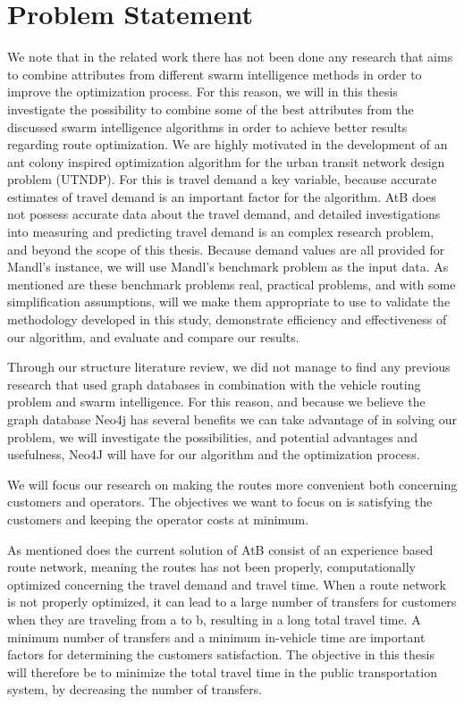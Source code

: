 \section{Problem Statement} 

We note that in the related work there has not been done any research that aims to combine attributes from different swarm intelligence methods in order to improve the optimization process. For this reason, we will in this thesis investigate the possibility to combine some of the best attributes from the discussed swarm intelligence algorithms in order to achieve better results regarding route optimization. We are highly motivated in the development of an ant colony inspired optimization algorithm for the urban transit network design problem (UTNDP). For this is travel demand a key variable, because accurate estimates of travel demand is an important factor for the algorithm. AtB does not possess accurate data about the travel demand, and detailed investigations into measuring and predicting travel demand is an complex research problem, and beyond the scope of this thesis. Because demand values are all provided for Mandl's instance, we will use Mandl's benchmark problem \citep{mandl79} as the input data. As mentioned are these benchmark problems real, practical problems, and with some simplification assumptions, will we make them appropriate to use to validate the methodology developed in this study, demonstrate efficiency and effectiveness of our algorithm, and evaluate and compare our results. 

Through our structure literature review, we did not manage to find any previous research that used graph databases in combination with the vehicle routing problem and swarm intelligence. For this reason, and because we believe the graph database Neo4j \citep{website:neo4j} has several benefits we can take advantage of in solving our problem, we will investigate the possibilities, and potential advantages and usefulness, Neo4J will have for our algorithm and the optimization process.

We will focus our research on making the routes more convenient both concerning customers and operators. The objectives we want to focus on is satisfying the customers and keeping the operator costs at minimum. 

As mentioned does the current solution of AtB \citep{website:atb} consist of an experience based route network, meaning the routes has not been properly, computationally optimized concerning the travel demand and travel time. When a route network is not properly optimized, it can lead to a large number of transfers for customers when they are traveling from a to b, resulting in a long total travel time. A minimum number of transfers and a minimum in-vehicle time are important factors for determining the customers satisfaction. The objective in this thesis will therefore be to minimize the total travel time in the public transportation system, by decreasing the number of transfers. %


